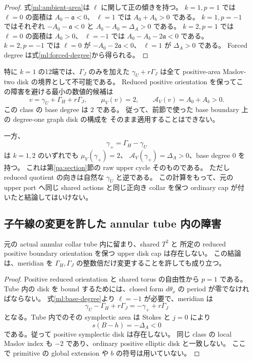\begin{proof}
式\eqref{ml:ambient-area}は $\ell$ に関して正の傾きを持つ。
$k=1,p=1$ では $\ell=0$ の面積は $A_0-\mathfrak a<0$、
$\ell=1$ では $A_0+A_b>0$ である。
$k=1,p=-1$ ではそれぞれ $-A_0-\mathfrak a<0$ と $A_b-A_0=\Delta_A>0$ である。
$k=2,p=1$ では $\ell=0$ の面積は $A_0>0$、
$\ell=-1$ では $A_0-A_b-2\mathfrak a<0$ である。
$k=2,p=-1$ では $\ell=0$ が $-A_0-2\mathfrak a<0$、
$\ell=1$ が $\Delta_A>0$ である。
Forced degree は式\eqref{ml:forced-degree}から得られる。
\end{proof}

特に $k=1$ の12端では、$\Gamma_J$ のみを加えた
$\gamma_U+r\Gamma_J$ は全て positive-area Maslov-two disk の境界として不可能である。
Reduced positive orientation を保ってこの障害を避ける最小の数値的候補は
\begin{equation}\label{ml:minimal-positive}
 v=\gamma_U+\Gamma_H+r\Gamma_J,
 \qquad \mu_V(v)=2,
 \qquad \mathcal A_V(v)=A_0+A_b>0.
\end{equation}
この class の base degree は $2$ である。
従って、前節で使った base boundary 上の degree-one graph disk の構成を
そのまま適用することはできない。

一方、
\begin{equation}\label{ml:raw-upper}
 \gamma_+=\Gamma_H-\gamma_U
\end{equation}
は $k=1,2$ のいずれでも $\mu_V(\gamma_+)=2$、
$\mathcal A_V(\gamma_+)=\Delta_A>0$、base degree $0$ を持つ。
これは第\ref{pa:section}節の raw upper cycle そのものである。
ただし reduced quotient の向きは自然な $\gamma_U$ と逆である。
この計算をもって、元の upper port へ同じ shared actions と同じ正向き collar を保つ
ordinary cap が付いたと結論してはいけない。

\subsection{子午線の変更を許した annular tube 内の障害}

\begin{corollary}
\label{ml:tube-obstruction}
元の actual annular collar tube 内に留まり、shared $T^2$ と
所定の reduced positive boundary orientation を保つ upper disk cap は存在しない。
この結論は、meridian を $\Gamma_H,\Gamma_J$ の整数倍だけ変更することを許しても成り立つ。
\end{corollary}

\begin{proof}
Positive reduced orientation と shared torus の自由性から $p=1$ である。
Tube 内の disk を bound するためには、closed form $d\theta_x$ の period が零でなければならない。
式\eqref{ml:base-degree}より $\ell=-1$ が必要で、meridian は
\[
 \gamma_U-\Gamma_H+r\Gamma_J=-\gamma_++r\Gamma_J
\]
となる。Tube 内でのその symplectic area は Stokes と $j=0$ により
\[
 s(B-h)=-\Delta_A<0
\]
である。従って positive symplectic disk は存在しない。
同じ class の local Maslov index も $-2$ であり、ordinary positive elliptic disk と一致しない。
ここで primitive の global extension や $b$ の符号は用いていない。
\end{proof}

